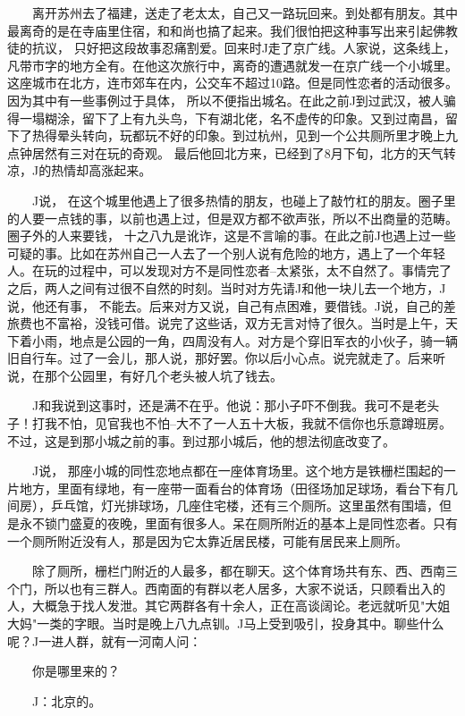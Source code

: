  　　离开苏州去了福建，送走了老太太，自己又一路玩回来。到处都有朋友。其中最离奇的是在寺庙里住宿，和和尚也搞了起来。我们很怕把这种事写出来引起佛教徒的抗议， 只好把这段故事忍痛割爱。回来时J走了京广线。人家说，这条线上，凡带市字的地方全有。在他这次旅行中，离奇的遭遇就发一在京广线一个小城里。这座城市在北方，连市郊车在内，公交车不超过10路。但是同性恋者的活动很多。因为其中有一些事例过于具体， 所以不便指出城名。在此之前J到过武汉，被人骗得一塌糊涂，留下了上有九头鸟，下有湖北佬，名不虚传的印象。又到过南昌，留下了热得晕头转向，玩都玩不好的印象。到过杭州，见到一个公共厕所里才晚上九点钟居然有三对在玩的奇观。 最后他回北方来，已经到了8月下旬，北方的天气转凉，J的热情却高涨起来。 
 
 　　J说， 在这个城里他遇上了很多热情的朋友，也碰上了敲竹杠的朋友。圈子里的人要一点钱的事，以前也遇上过，但是双方都不欲声张，所以不出商量的范畴。圈子外的人来要钱， 十之八九是讹诈，这是不言喻的事。在此之前J也遇上过一些可疑的事。比如在苏州自己一人去了一个别人说有危险的地方，遇上了一个年轻人。在玩的过程中，可以发现对方不是同性恋者--太紧张，太不自然了。事情完了之后，两人之间有过很不自然的时刻。当时对方先请J和他一块儿去一个地方，J说，他还有事， 不能去。后来对方又说，自己有点困难，要借钱。J说，自己的差旅费也不富裕，没钱可借。说完了这些话，双方无言对恃了很久。当时是上午，天下着小雨，地点是公园的一角，四周没有人。对方是个穿旧军衣的小伙子，骑一辆旧自行车。过了一会儿，那人说，那好罢。你以后小心点。说完就走了。后来听说，在那个公园里，有好几个老头被人坑了钱去。 
 
 　　J和我说到这事时，还是满不在乎。他说：那小子吓不倒我。我可不是老头子！打我不怕，见官我也不怕--大不了一人五十大板，我就不信你也乐意蹲班房。不过，这是到那小城之前的事。到过那小城后，他的想法彻底改变了。 
 
 　　J说， 那座小城的同性恋地点都在一座体育场里。这个地方是铁栅栏围起的一片地方，里面有绿地，有一座带一面看台的体育场（田径场加足球场，看台下有几间房），乒乓馆，灯光排球场，几座住宅楼，还有三个厕所。这里虽然有围墙，但是永不锁门盛夏的夜晚，里面有很多人。呆在厕所附近的基本上是同性恋者。只有一个厕所附近没有人，那是因为它太靠近居民楼，可能有居民来上厕所。 
 
 　　除了厕所，栅栏门附近的人最多，都在聊天。这个体育场共有东、西、西南三个门，所以也有三群人。西南面的有群以老人居多，大家不说话，只顾看出入的人，大概急于找人发泄。其它两群各有十余人，正在高谈阔论。老远就听见"大姐大妈"一类的字眼。当时是晚上八九点钏。J马上受到吸引，投身其中。聊些什么呢？J一进人群，就有一河南人问： 
 
 　　你是哪里来的？ 
 
 　　J：北京的。 
 
